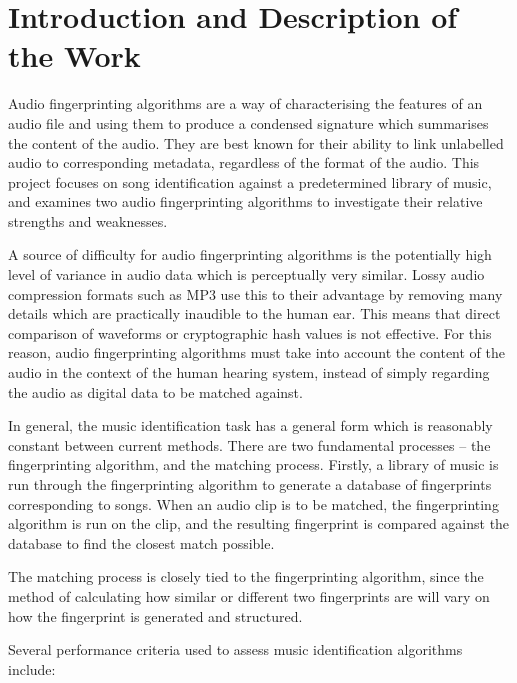 \documentclass[12pt]{article}
\begin{document}
\section*{Introduction and Description of the Work}

Audio fingerprinting algorithms are a way of characterising the features of an audio file and using them to produce a condensed signature which summarises the content of the audio. They are best known for their ability to link unlabelled audio to corresponding metadata, regardless of the format of the audio. This project focuses on song identification against a predetermined library of music, and examines two audio fingerprinting algorithms to investigate their relative strengths and weaknesses.

A source of difficulty for audio fingerprinting algorithms is the potentially high level of variance in audio data which is perceptually very similar. Lossy audio compression formats such as MP3 use this to their advantage by removing many details which are practically inaudible to the human ear. This means that direct comparison of waveforms or cryptographic hash values is not effective. For this reason, audio fingerprinting algorithms must take into account the content of the audio in the context of the human hearing system, instead of simply regarding the audio as digital data to be matched against.

In general, the music identification task has a general form which is reasonably constant between current methods. There are two fundamental processes -- the fingerprinting algorithm, and the matching process. Firstly, a library of music is run through the fingerprinting algorithm to generate a database of fingerprints corresponding to songs. When an audio clip is to be matched, the fingerprinting algorithm is run on the clip, and the resulting fingerprint is compared against the database to find the closest match possible.

The matching process is closely tied to the fingerprinting algorithm, since the method of calculating how similar or different two fingerprints are will vary on how the fingerprint is generated and structured.

Several performance criteria used to assess music identification algorithms include:
\end{document}
